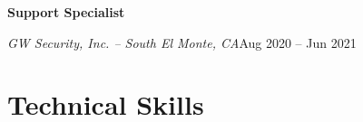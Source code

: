 \documentclass[a4paper]{article}
\begin{document}
\begin{minipage}[t]{0.62\textwidth}
    \vspace{0.5em}
    \textbf{Support Specialist}\par
    \textit{GW Security, Inc. -- South El Monte, CA}\hfill Aug 2020 -- Jun 2021

    \section{Technical Skills}
    \begin{itemize}
        \apptechnicalskills{}
    \end{itemize}
\end{minipage}
\end{document}
